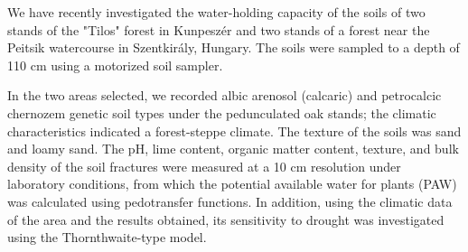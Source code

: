 We have recently investigated the water-holding capacity of the soils of two stands of the "Tilos" forest in Kunpeszér and two stands of a forest near the Peitsik watercourse in Szentkirály, Hungary. The soils were sampled to a depth of 110 cm using a motorized soil sampler.

In the two areas selected, we recorded albic arenosol (calcaric) and petrocalcic chernozem genetic soil types under the pedunculated oak stands; the climatic characteristics indicated a forest-steppe climate. The texture of the soils was sand and loamy sand. The pH, lime content, organic matter content, texture, and bulk density of the soil fractures were measured at a 10 cm resolution under laboratory conditions, from which the potential available water for plants (PAW) was calculated using pedotransfer functions. In addition, using the climatic data of the area and the results obtained, its sensitivity to drought was investigated using the Thornthwaite-type model.



\newpage{}
{}
\begin{flushleft}







\end{flushleft}

\noindent

